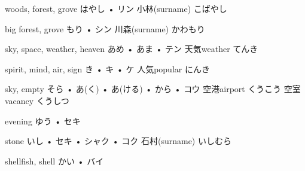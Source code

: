 



\setcounter{cardnum}{25}

		{woods, forest, grove}
		{はやし • リン}
		{小林}{(surname) こばやし}
		{}{}
		{}{}
		{}{}
		{}{}

		{big forest, grove}
		{もり • シン}
		{川森}{(surname) かわもり}
		{}{}
		{}{}
		{}{}
		{}{}

		{sky, space, weather, heaven}
		{あめ • あま • テン}
		{天気}{weather てんき}
		{}{}
		{}{}
		{}{}
		{}{}

		{spirit, mind, air, sign}
		{き • キ • ケ}
		{人気}{popular にんき}
		{}{}
		{}{}
		{}{}
		{}{}

		{sky, empty}
		{そら • あ(く) • あ(ける) • から • コウ}
		{空港}{airport くうこう}
		{空室}{vacancy くうしつ}
		{}{}
		{}{}
		{}{}

		{evening}
		{ゆう • セキ}
		{}{}
		{}{}
		{}{}
		{}{}
		{}{}

		{stone}
		{いし • セキ • シャク • コク}
		{石村}{(surname) いしむら}
		{}{}
		{}{}
		{}{}
		{}{}

		{shellfish, shell}
		{かい • バイ}
		{}{}
		{}{}
		{}{}
		{}{}
		{}{}

